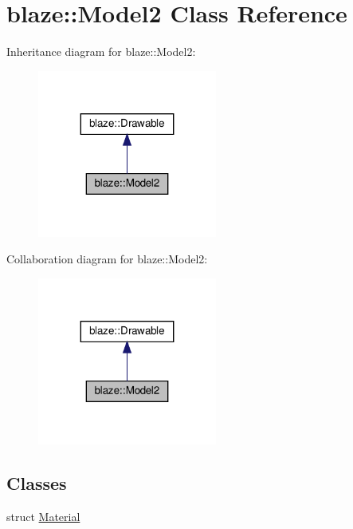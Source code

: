 \hypertarget{classblaze_1_1Model2}{}\section{blaze\+:\+:Model2 Class Reference}
\label{classblaze_1_1Model2}


Inheritance diagram for blaze\+:\+:Model2\+:\nopagebreak
\begin{figure}[H]
\begin{center}
\leavevmode
\includegraphics[width=167pt]{classblaze_1_1Model2__inherit__graph}
\end{center}
\end{figure}


Collaboration diagram for blaze\+:\+:Model2\+:\nopagebreak
\begin{figure}[H]
\begin{center}
\leavevmode
\includegraphics[width=167pt]{classblaze_1_1Model2__coll__graph}
\end{center}
\end{figure}
\subsection*{Classes}
\begin{DoxyCompactItemize}
\item 
struct \hyperlink{structblaze_1_1Model2_1_1Material}{Material}
\end{DoxyCompactItemize}
